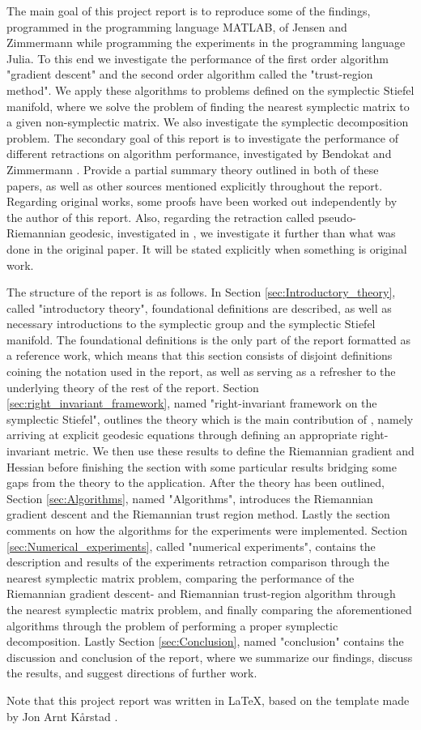 The main goal of this project report is to reproduce some of the findings, programmed in the programming language MATLAB, of Jensen and Zimmermann \cite{JensenZimmermann2024} while programming the experiments in the programming language Julia. To this end we investigate the performance of the first order algorithm "gradient descent" and the second order algorithm called the "trust-region method". We apply these algorithms to problems defined on the symplectic Stiefel manifold, where we solve the problem of finding the nearest symplectic matrix to a given non-symplectic matrix. We also investigate the symplectic decomposition problem. The secondary goal of this report is to investigate the performance of different retractions on algorithm performance, investigated by Bendokat and Zimmermann \cite{BendokatZimmermann2021}. Provide a partial summary theory outlined in both of these papers, as well as other sources mentioned explicitly throughout the report. Regarding original works, some proofs have been worked out independently by the author of this report. Also, regarding the retraction called pseudo-Riemannian geodesic, investigated in \cite{BendokatZimmermann2021}, we investigate it further than what was done in the original paper. It will be stated explicitly when something is original work. 

The structure of the report is as follows. In Section \ref{sec:Introductory_theory}, called "introductory theory", foundational definitions are described, as well as necessary introductions to the symplectic group and the symplectic Stiefel manifold. The foundational definitions is the only part of the report formatted as a reference work, which means that this section consists of disjoint definitions coining the notation used in the report, as well as serving as a refresher to the underlying theory of the rest of the report. Section \ref{sec:right_invariant_framework}, named "right-invariant framework on the symplectic Stiefel", outlines the theory which is the main contribution of \cite{BendokatZimmermann2021}, namely arriving at explicit geodesic equations through defining an appropriate right-invariant metric. We then use these results to define the Riemannian gradient and Hessian before finishing the section with some particular results bridging some gaps from the theory to the application. After the theory has been outlined, Section \ref{sec:Algorithms}, named "Algorithms", introduces the Riemannian gradient descent and the Riemannian trust region method. Lastly the section comments on how the algorithms for the experiments were implemented. Section \ref{sec:Numerical_experiments}, called "numerical experiments", contains the description and results of the experiments retraction comparison through the nearest symplectic matrix problem, comparing the performance of the Riemannian gradient descent- and Riemannian trust-region algorithm through the nearest symplectic matrix problem, and finally comparing the aforementioned algorithms through the problem of performing a proper symplectic decomposition. Lastly Section \ref{sec:Conclusion}, named "conclusion" contains the discussion and conclusion of the report, where we summarize our findings, discuss the results, and suggest directions of further work.  

Note that this project report was written in \LaTeX, based on the template made by Jon Arnt Kårstad \cite{Kårstad2024}.
